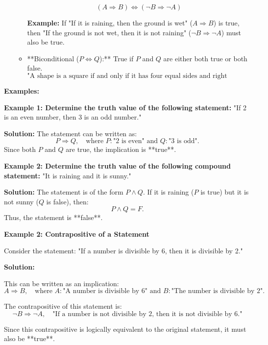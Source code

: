 \begin{itemize}
\begin{itemize}
		\[
		(A \Rightarrow B) \Leftrightarrow (\neg B \Rightarrow \neg A)
		\]
		
		\textbf{Example:}  
		If "If it is raining, then the ground is wet" ($A \Rightarrow B$) is true, then "If the ground is not wet, then it is not raining" ($\neg B \Rightarrow \neg A$) must also be true.
		
		\item **Biconditional ($P \Leftrightarrow Q$):** True if $P$ and $Q$ are either both true or both false.
		\[
		\text{"A shape is a square if and only if it has four equal sides and right angles."}
		\]
	\end{itemize}
	
	
\end{itemize}

\textbf{Examples:}

\begin{flushleft}
	\textbf{Example 1: Determine the truth value of the following statement:}  
	"If 2 is an even number, then 3 is an odd number."
	
	\textbf{Solution:}  
	The statement can be written as:
	\[
	P \Rightarrow Q, \quad \text{where } P: \text{"2 is even"} \text{ and } Q: \text{"3 is odd"}.
	\]
	Since both $P$ and $Q$ are true, the implication is **true**.
\end{flushleft}

\begin{flushleft}
	\textbf{Example 2: Determine the truth value of the following compound statement:}  
	"It is raining and it is sunny."
	
	\textbf{Solution:}  
	The statement is of the form $P \land Q$. If it is raining ($P$ is true) but it is not sunny ($Q$ is false), then:
	\[
	P \land Q = F.
	\]
	Thus, the statement is **false**.
\end{flushleft}
\begin{flushleft}
	\textbf{Example 2: Contrapositive of a Statement}
	
	Consider the statement:  
	"If a number is divisible by 6, then it is divisible by 2."
	
	\textbf{Solution:}
	
	This can be written as an implication:
	\[
	A \Rightarrow B, \quad \text{where } A: \text{"A number is divisible by 6"} \text{ and } B: \text{"The number is divisible by 2"}.
	\]
	
	The contrapositive of this statement is:
	\[
	\neg B \Rightarrow \neg A, \quad \text{"If a number is not divisible by 2, then it is not divisible by 6."}
	\]
	
	Since this contrapositive is logically equivalent to the original statement, it must also be **true**.
\end{flushleft}